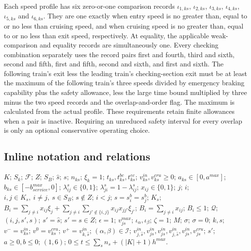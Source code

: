 \documentclass[10pt]{article}
\begin{document}
Each speed profile has six zero-or-one comparison records $\iota_{1,ks}$, $\iota_{2,ks}$, $\iota_{3,ks}$, $\iota_{4,ks}$, $\iota_{5,ks}$ and $\iota_{6,ks}$. They are one exactly when entry speed is no greater than, equal to or no less than cruising speed, and when cruising speed is no greater than, equal to or no less than exit speed, respectively. At equality, the applicable weak-comparison and equality records are simultaneously one. Every checking combination separately uses the record pairs first and fourth, third and sixth, second and fifth, first and fifth, second and sixth, and first and sixth. The following train's exit less the leading train's checking-section exit must be at least the maximum of the following train's three speeds divided by emergency braking capability plus the safety allowance, less the large time bound multiplied by three minus the two speed records and the overlap-and-order flag. The maximum is calculated from the actual profile. These requirements retain finite allowances when a pair is inactive. Requiring an unreduced safety interval for every overlap is only an optional conservative operating choice.

\subsection*{Inline notation and relations}
$K$; $S_k$; $\mathcal F$; $Z$; $S_B$; $\widehat s$; $s$; $n_{ks}$; $\xi_k=1$; $t_{ks},t^{bc}_{ks},t^{ec}_{ks}$; $v^{in}_{ks},v^{cru}_{ks}\ge0$; $a_{ks}\in[0,a^{max}]$; $b_{ks}\in[-b^{max}_{service},0]$; $\lambda_{ij}^s\in\{0,1\}$; $\lambda_{ji}^s=1-\lambda_{ij}^s$; $x_{ij}\in\{0,1\}$; $j$; $i$; $i,j\in K_s,\ i\ne j,\ s\in S_B$; $s\notin Z$; $i<j$; $s=s_i^b=s_j^b$; $K_s$; $B_i=\sum_{j\ne i}x_{ij}\xi_j+
\sum_{j\ne i}\sum_{j'\notin\{i,j\}}x_{ij}x_{jj'}\xi_{j'}$; $B_i=\sum_{j\ne i}x_{ij}$; $B_i\le1$; $\mathcal Q$; $(i,j,s',s)$; $s'=\widehat s$; $s'=s\in Z$; $\epsilon=1$; $v^{max}_{js}$; $\iota_\alpha,\iota_\beta$; $\zeta=1$; $M$; $\sigma$; $\sigma=0$; $k,s$; $v^-=v^{in}_{ks}$; $v^0=v^{cru}_{ks}$; $v^+=v^{in}_{k,\widehat s}$; $(\alpha,\beta)\in\mathcal I$; $v^{in}_{j,\widehat s},v^{in}_{js},v^{in}_{js},
v^{in}_{j,\widehat s},v^{in}_{js},v^{cru}_{js}$; $s'$; $a\ge0,b\le0$; $(1,6)$; $0\le t\le\sum_sn_s+(|K|+1)h^{max}$.
\end{document}
